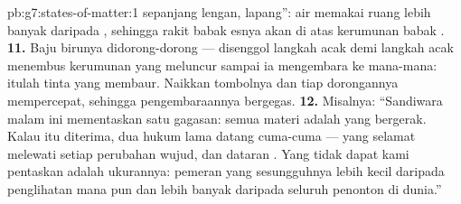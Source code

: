 \begin{solution}{pb:g7:states-of-matter:1}
sepanjang lengan, lapang'':  air memakai ruang lebih banyak
daripada , sehingga rakit babak esnya akan  di atas
kerumunan babak .
\textbf{11.} Baju birunya didorong-dorong --- disenggol langkah acak
demi langkah acak menembus kerumunan yang meluncur sampai ia
mengembara ke mana-mana: itulah tinta yang membaur. Naikkan tombolnya
dan tiap dorongannya mempercepat, sehingga pengembaraannya bergegas.
\textbf{12.} Misalnya: ``Sandiwara malam ini mementaskan satu gagasan:
semua materi adalah  yang bergerak. Kalau itu diterima, dua
hukum lama datang cuma-cuma ---  yang selamat melewati setiap
perubahan wujud, dan dataran . Yang tidak dapat kami
pentaskan adalah ukurannya: pemeran yang sesungguhnya lebih kecil
daripada penglihatan mana pun dan lebih banyak daripada seluruh
penonton di dunia.''
\end{solution}
